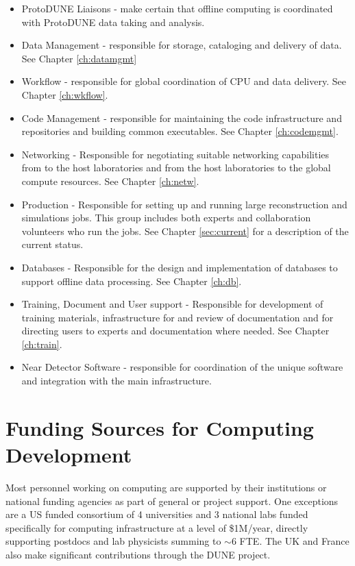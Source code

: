 \documentclass[../main-v1.tex]{subfiles}
\begin{document}
\begin{itemize} 
\item ProtoDUNE Liaisons - make certain that offline computing is coordinated with ProtoDUNE data taking and analysis.

\item Data Management - responsible for storage, cataloging and delivery of data. See Chapter \ref{ch:datamgmt}

\item Workflow - responsible for global coordination of CPU and data delivery. See Chapter \ref{ch:wkflow}.


\item Code Management - responsible for maintaining the code infrastructure and  repositories and building common executables.  See Chapter \ref{ch:codemgmt}.

\item{Networking} -  Responsible for negotiating suitable networking capabilities from  to the host laboratories and from the host laboratories to the global compute resources.  See Chapter \ref{ch:netw}. 

\item{Production} - Responsible for setting up and running large reconstruction and simulations jobs. This group includes both experts and collaboration volunteers who run the jobs. See Chapter \ref{sec:current} for a description of the current status. 


\item{Databases} - Responsible for the design and implementation of databases to support offline data processing. See Chapter \ref{ch:db}.

\item{Training, Document and User support} - Responsible for development of training materials, infrastructure for and review of documentation and for directing users to experts and documentation where needed. See Chapter \ref{ch:train}.

\item Near Detector Software - responsible for coordination of the unique  software and integration with the main  infrastructure.

\end{itemize}

\section{Funding Sources for Computing Development}
Most personnel working on  computing are supported by their institutions or national funding agencies as part of general or  project support.  One exceptions are a US  funded consortium of 4 universities and 3 national labs funded specifically for  computing infrastructure at a level of \$1M/year, directly supporting postdocs and lab physicists summing to $\sim 6$ FTE.  The UK and France also make significant contributions through the DUNE project. 
\end{document}
